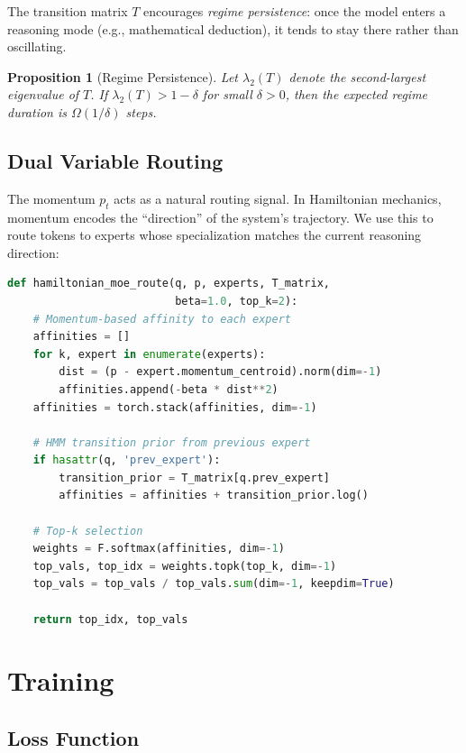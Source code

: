\documentclass[11pt,letterpaper]{article}
\newtheorem{proposition}[theorem]{Proposition}
\begin{document}
The transition matrix $T$ encourages \emph{regime persistence}: once the model enters a reasoning mode (e.g., mathematical deduction), it tends to stay there rather than oscillating.

\begin{proposition}[Regime Persistence]
Let $\lambda_2(T)$ denote the second-largest eigenvalue of $T$. If $\lambda_2(T) > 1 - \delta$ for small $\delta > 0$, then the expected regime duration is $\Omega(1/\delta)$ steps.
\end{proposition}

\subsection{Dual Variable Routing}

The momentum $p_t$ acts as a natural routing signal. In Hamiltonian mechanics, momentum encodes the ``direction'' of the system's trajectory. We use this to route tokens to experts whose specialization matches the current reasoning direction:

\begin{lstlisting}[language=Python,caption=Hamiltonian MoE routing]
def hamiltonian_moe_route(q, p, experts, T_matrix,
                          beta=1.0, top_k=2):
    # Momentum-based affinity to each expert
    affinities = []
    for k, expert in enumerate(experts):
        dist = (p - expert.momentum_centroid).norm(dim=-1)
        affinities.append(-beta * dist**2)
    affinities = torch.stack(affinities, dim=-1)

    # HMM transition prior from previous expert
    if hasattr(q, 'prev_expert'):
        transition_prior = T_matrix[q.prev_expert]
        affinities = affinities + transition_prior.log()

    # Top-k selection
    weights = F.softmax(affinities, dim=-1)
    top_vals, top_idx = weights.topk(top_k, dim=-1)
    top_vals = top_vals / top_vals.sum(dim=-1, keepdim=True)

    return top_idx, top_vals
\end{lstlisting}

\section{Training}
\label{sec:training}

\subsection{Loss Function}
\end{document}
